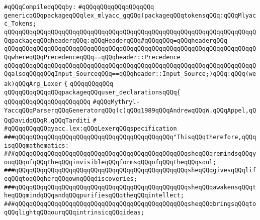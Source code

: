 \label{src/app/yacc/src/yacc.lex.pkg}
\newline
\verb|#qQQqCompiledqQQqby:|\newline
\verb|#qQQqqQQqqQQqqQQqqQQq|\newline
\newline
\verb|genericqQQqpackageqQQqlex_mlyacc_gqQQq(packageqQQqtokensqQQq:qQQqMlyacc_Tokens;|\newline
\verb|qQQqqQQqqQQqqQQqqQQqqQQqqQQqqQQqqQQqqQQqqQQqqQQqqQQqqQQqqQQqqQQqqQQqqQQqpackageqQQqheaderqQQq:qQQqHeaderqQQq#qQQqqQQq=qQQqheaderqQQq|\newline
\verb|qQQqqQQqqQQqqQQqqQQqqQQqqQQqqQQqqQQqqQQqqQQqqQQqqQQqqQQqqQQqqQQqqQQqqQQqwhereqQQqPrecedenceqQQq==qQQqheader::Precedence|\newline
\verb|qQQqqQQqqQQqqQQqqQQqqQQqqQQqqQQqqQQqqQQqqQQqqQQqqQQqqQQqqQQqqQQqqQQqqQQqalsoqQQqqQQqInput_SourceqQQq==qQQqheader::Input_Source;)qQQq:qQQq(weak)qQQqArg_Lexer|\newline
\verb|{|\newline
\verb|qQQqqQQqqQQq|\newline
\verb|qQQqqQQqqQQqqQQqpackageqQQquser_declarationsqQQq{|\newline
\verb|qQQqqQQqqQQqqQQqqQQqqQQq|\newline
\verb|#qQQqMythryl-YaccqQQqParserqQQqGeneratorqQQq(c)qQQq1989qQQqAndrewqQQqW.qQQqAppel,qQQqDavidqQQqR.qQQqTarditi|\newline
\verb|#|\newline
\verb|#qQQqqQQqqQQqyacc.lex:qQQqLexerqQQqspecification|\newline
\newline
\newline
\newline
\verb|###qQQqqQQqqQQqqQQqqQQqqQQqqQQqqQQqqQQqqQQqqQQq"ThisqQQqtherefore,qQQqisqQQqmathematics:|\newline
\verb|###qQQqqQQqqQQqqQQqqQQqqQQqqQQqqQQqqQQqqQQqqQQqqQQqsheqQQqremindsqQQqyouqQQqofqQQqtheqQQqinvisibleqQQqformsqQQqofqQQqtheqQQqsoul;|\newline
\verb|###qQQqqQQqqQQqqQQqqQQqqQQqqQQqqQQqqQQqqQQqqQQqqQQqsheqQQqgivesqQQqlifeqQQqtoqQQqherqQQqownqQQqdiscoveries;|\newline
\verb|###qQQqqQQqqQQqqQQqqQQqqQQqqQQqqQQqqQQqqQQqqQQqqQQqsheqQQqawakensqQQqtheqQQqmindqQQqandqQQqpurifiesqQQqtheqQQqintellect;|\newline
\verb|###qQQqqQQqqQQqqQQqqQQqqQQqqQQqqQQqqQQqqQQqqQQqqQQqsheqQQqbringsqQQqtoqQQqlightqQQqourqQQqintrinsicqQQqideas;|\newline
